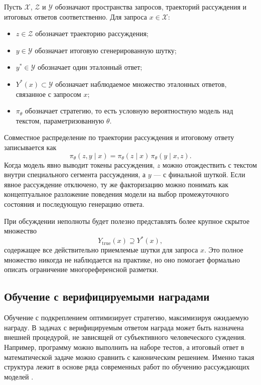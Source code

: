 Пусть \(\mathcal{X}\), \(\mathcal{Z}\) и \(\mathcal{Y}\) обозначают пространства запросов, траекторий рассуждения и итоговых ответов соответственно. Для запроса \(x\in\mathcal{X}\):
\begin{itemize}
    \item \(z\in\mathcal{Z}\) обозначает траекторию рассуждения;
    \item \(y\in\mathcal{Y}\) обозначает итоговую сгенерированную шутку;
    \item \(y^{*}\in\mathcal{Y}\) обозначает один эталонный ответ;
    \item \(Y^{*}(x)\subset\mathcal{Y}\) обозначает наблюдаемое множество эталонных ответов, связанное с запросом \(x\);
    \item \(\pi_{\theta}\) обозначает стратегию, то есть условную вероятностную модель над текстом, параметризованную \(\theta\).
\end{itemize}

Совместное распределение по траектории рассуждения и итоговому ответу записывается как
\[
    \pi_{\theta}(z,y\mid x)
    =
    \pi_{\theta}(z\mid x)\,
    \pi_{\theta}(y\mid x,z).
\]
Когда модель явно выводит токены рассуждения, \(z\) можно отождествить с текстом внутри специального сегмента рассуждения, а \(y\) --- с финальной шуткой. Если явное рассуждение отключено, ту же факторизацию можно понимать как концептуальное разложение поведения модели на выбор промежуточного состояния и последующую генерацию ответа.

При обсуждении неполноты будет полезно представлять более крупное скрытое множество
\[
    Y_{\mathrm{true}}(x)\supseteq Y^{*}(x),
\]
содержащее все действительно приемлемые шутки для запроса \(x\). Это полное множество никогда не наблюдается на практике, но оно помогает формально описать ограничение многореференсной разметки.

\subsection{Обучение с верифицируемыми наградами}

Обучение с подкреплением оптимизирует стратегию, максимизируя ожидаемую награду. В задачах с верифицируемым ответом награда может быть назначена внешней процедурой, не зависящей от субъективного человеческого суждения. Например, программу можно выполнить на наборе тестов, а итоговый ответ в математической задаче можно сравнить с каноническим решением. Именно такая структура лежит в основе ряда современных работ по обучению рассуждающих моделей \citep{DeepSeek2025,Lightman2023}.


